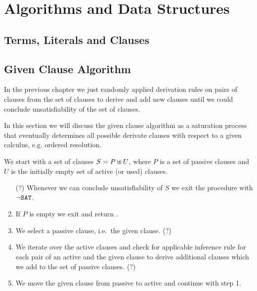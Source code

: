 
\chapter{Algorithms and Data Structures}

\section{Terms, Literals and Clauses}




\section{Given Clause Algorithm}

In the previous chapter we just randomly applied derivation rules
on pairs of clauses from the set of clauses 
to derive and add new clauses 
until we could conclude unsatisfiability of the set of clauses.

In this section we will discuss the given clause algorithm 
as a saturation process that eventually determines all possible derivate clauses
with respect to a given calculus, e.g. ordered resolution.




\begin{procedure}
	We start with a set of clauses $S = P \uplus U$, 
	where $P$ is a set of {\myem passive} clauses 
	and $U$ is the initially empty set of {\myem active} (or used) clauses.
	\begin{enumerate}
		\item[(\Lightning?)] Whenever we can conclude unsatisfiability of $S$ 
		we exit the procedure with $\lnot\texttt{SAT}$.
		\setcounter{enumi}{0}
		\item If $P$ is empty we exit and return \SAT.
		\item We select a passive clause, i.e.~the given clause. (\Lightning?)
		\item We iterate over the active clauses and check for applicable inference rule
		for each pair of an active and the given clause
		to derive additional clauses which we add to the set of passive clauses.
		(\Lightning?)
		\item We move the given clause from passive to active and continue with step 1.
	\end{enumerate}
\end{procedure}


